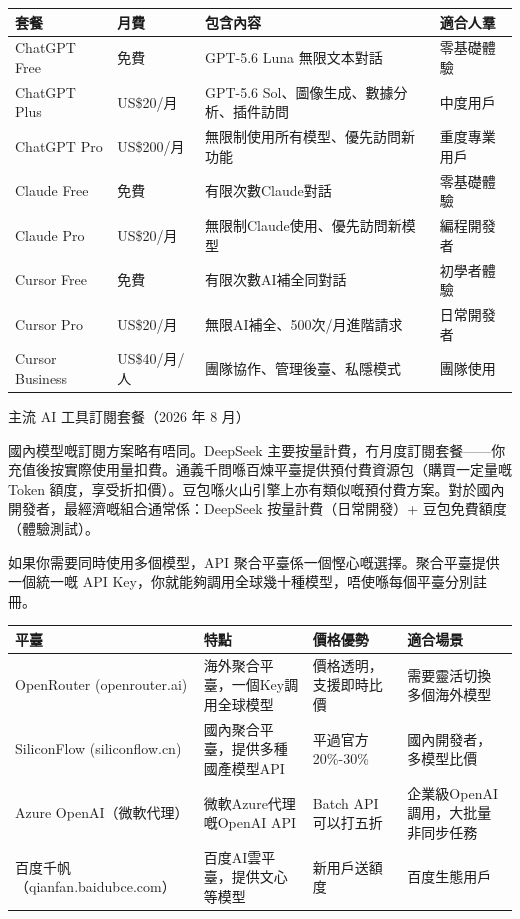 \begin{center}
\begin{tabularx}{\linewidth}{|X|X|X|X|}
\hline
\textbf{套餐} & \textbf{月費} & \textbf{包含內容} & \textbf{適合人羣} \tabularnewline
\hline
ChatGPT Free & 免費 & GPT-5.6 Luna 無限文本對話 & 零基礎體驗 \tabularnewline
ChatGPT Plus & US\$20/月 & GPT-5.6 Sol、圖像生成、數據分析、插件訪問 & 中度用戶 \tabularnewline
ChatGPT Pro & US\$200/月 & 無限制使用所有模型、優先訪問新功能 & 重度專業用戶 \tabularnewline
Claude Free & 免費 & 有限次數Claude對話 & 零基礎體驗 \tabularnewline
Claude Pro & US\$20/月 & 無限制Claude使用、優先訪問新模型 & 編程開發者 \tabularnewline
Cursor Free & 免費 & 有限次數AI補全同對話 & 初學者體驗 \tabularnewline
Cursor Pro & US\$20/月 & 無限AI補全、500次/月進階請求 & 日常開發者 \tabularnewline
Cursor Business & US\$40/月/人 & 團隊協作、管理後臺、私隱模式 & 團隊使用 \tabularnewline
\hline
\end{tabularx}
\end{center}

\begin{center}\small\color{gray}主流 AI 工具訂閱套餐（2026 年 8 月）\end{center}

國內模型嘅訂閱方案略有唔同。DeepSeek 主要按量計費，冇月度訂閱套餐——你充值後按實際使用量扣費。通義千問喺百煉平臺提供預付費資源包（購買一定量嘅 Token 額度，享受折扣價）。豆包喺火山引擎上亦有類似嘅預付費方案。對於國內開發者，最經濟嘅組合通常係：DeepSeek 按量計費（日常開發）+ 豆包免費額度（體驗測試）。


如果你需要同時使用多個模型，API 聚合平臺係一個慳心嘅選擇。聚合平臺提供一個統一嘅 API Key，你就能夠調用全球幾十種模型，唔使喺每個平臺分別註冊。

\begin{center}
\begin{tabularx}{\linewidth}{|X|X|X|X|}
\hline
\textbf{平臺} & \textbf{特點} & \textbf{價格優勢} & \textbf{適合場景} \tabularnewline
\hline
OpenRouter (openrouter.ai) & 海外聚合平臺，一個Key調用全球模型 & 價格透明，支援即時比價 & 需要靈活切換多個海外模型 \tabularnewline
SiliconFlow (siliconflow.cn) & 國內聚合平臺，提供多種國產模型API & 平過官方20\%-30\% & 國內開發者，多模型比價 \tabularnewline
Azure OpenAI（微軟代理） & 微軟Azure代理嘅OpenAI API & Batch API 可以打五折 & 企業級OpenAI調用，大批量非同步任務 \tabularnewline
百度千帆（qianfan.baidubce.com） & 百度AI雲平臺，提供文心等模型 & 新用戶送額度 & 百度生態用戶 \tabularnewline
\hline
\end{tabularx}
\end{center}

